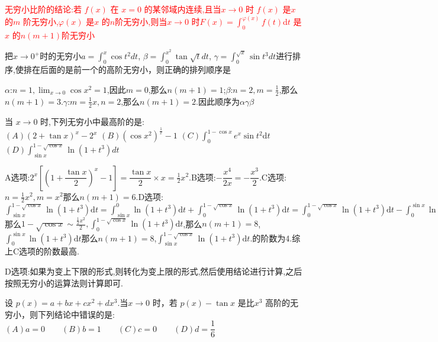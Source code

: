 \documentclass[8pt a4paper, oneside, UTF8]{ctexbook}
\begin{document}
\begin{sloppypar}
    \textcolor{red}{无穷小比阶的结论:若 $f(x)$ 在 $x=0$ 的某邻域内连续,且当$x\to0$ 时 $f(x)$ 是$x$的$m$ 阶无穷小,$\varphi(x)$ 是$x$ 的$n$阶无穷小,则当$x\to0$ 时$F( x) = \int _0^{\varphi(x)}f(t)$d$t$ 是$x$ 的$n(m+1)$阶无穷小}
    \begin{problem}
        把$x\to 0^+$时的无穷小$a= \int _0^x \cos t^2dt$, $\beta= \int _0^{x^2} \tan\sqrt{t} dt$, $\gamma= \int _0^{\sqrt{x}} \sin t^3 dt$进行排序,使排在后面的是前一个的高阶无穷小，则正确的排列顺序是
    \end{problem}
    \begin{solution}
        $\alpha$:$n=1,\lim_{x\to 0} \cos x^2=1$,因此$m=0$,那么$n(m+1)=1$;$\beta$:$n=2,m=\frac{1}{2}$,那么$n(m+1)=3$.$\gamma$:$m=\frac{1}{2}x,n=2$,那么$n(m+1)=2$.因此顺序为$\alpha \gamma \beta$
    \end{solution}
    \begin{problem}
        当 $x\to0$ 时,下列无穷小中最高阶的是:\\
        $\left(A\right)\left(2+\tan x\right)^{x}-2^{x}$ \qquad $\left(B\right)\left(\cos x^{2}\right)^{\frac{1}{x}}-1$ \qquad $( C) \int _0^{1- \cos x}e^{x}\sin t^2$d$t$ \qquad$\left(D\right)\int_{\sin x}^{1-\sqrt{\cos x}}\ln(1+t^{3})dt$
    \end{problem}
    \begin{solution}
        A选项:$2^x[(1+\dfrac{\tan x}{2})^x-1]=\dfrac{\tan x}{2}\times x=\frac{1}{2}x^2$.B选项:$-\dfrac{x^4}{2x}=-\dfrac{x^3}{2}$.C选项:$n=\frac{1}{2}x^2,m=x^2$那么$n(m+1)=6$.D选项:$\int_{\sin x}^{1-\sqrt{\cos x}}\ln(1+t^3) \mathrm{d}t=\int_{\sin x}^0\ln(1+t^3) \mathrm{d}t+\int_0^{1-\sqrt{\cos x}}\ln(1+t^3) \mathrm{d}t=\int_{0}^{1-\sqrt{\cos x}}\ln(1+t^{3})\mathrm{d}t-\int_{0}^{\sin x}\ln(1+t^{3})dt$那么$1-\sqrt{\cos x}\sim\frac{\frac12x^2}2,\int_0^{1-\sqrt{\cos x}}\ln(1+t^3) \mathrm{d}t$,那么$n(m+1)=8$,$\int_0^{\sin x}\ln\left(1+t^3\right)\mathrm{d}t$那么$n(m+1)=8$,$\int_{\sin x}^{1-\sqrt{\cos x}}\ln(1+t^3) \mathrm{d}t.$的阶数为4.综上C选项的阶数最高.
    \end{solution}
    \begin{note}
        D选项:如果为变上下限的形式,则转化为变上限的形式,然后使用结论进行计算,之后按照无穷小的运算法则计算即可.
    \end{note}
    \begin{problem}
        设 $p(x)=a+bx+cx^2+dx^3$.当$x\to0$ 时，若 $p(x)-\tan x$ 是比$x^{3}$ 高阶的无穷小，则下列结论中错误的是:\\
        $(A)a=0 \qquad (B)b=1 \qquad (C)c=0 \qquad (D)d=\dfrac{1}{6}$
    \end{problem}

\end{sloppypar}
\end{document}
